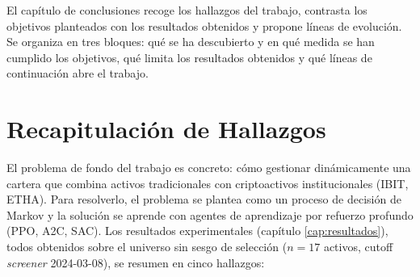 \documentclass[IB,a4paper]{TFUOC}
\begin{document}
El capítulo de conclusiones recoge los hallazgos del trabajo, contrasta los objetivos planteados con los resultados obtenidos y propone líneas de evolución. Se organiza en tres bloques: qué se ha descubierto y en qué medida se han cumplido los objetivos, qué limita los resultados obtenidos y qué líneas de continuación abre el trabajo.

\section{Recapitulación de Hallazgos}
\label{sec:conclusiones_hallazgos}

El problema de fondo del trabajo es concreto: cómo gestionar dinámicamente una cartera que combina activos tradicionales con criptoactivos institucionales (IBIT, ETHA). Para resolverlo, el problema se plantea como un proceso de decisión de Markov y la solución se aprende con agentes de aprendizaje por refuerzo profundo (PPO, A2C, SAC). Los resultados experimentales (capítulo \ref{cap:resultados}), todos obtenidos sobre el universo sin sesgo de selección ($n=17$ activos, cutoff \textit{screener} 2024-03-08), se resumen en cinco hallazgos:
\end{document}
